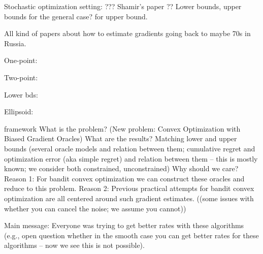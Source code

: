 Stochastic optimization setting: ??? Shamir's paper \cite{shamir2012complexity}??
Lower bounds, upper bounds for the general case?
\cite{hazan2014bandit} for upper bound.

All kind of papers about how to estimate gradients going back to maybe 70s in Russia.

One-point: \cite{flaxman2005online}

Two-point: \cite{AgDeXi10}

Lower bds: \cite{raginsky2011information} \cite{Chen88:LB-AoS}

Ellipsoid: \cite{AgFoHsuKaRa13:SIAM}



 framework
What is the problem? (New problem: Convex Optimization with Biased Gradient Oracles)
What are the results? Matching lower and upper bounds (several oracle models and relation between them; cumulative regret and optimization error (aka simple regret) and relation between them -- this is mostly known; we consider both constrained, unconstrained)
Why should we care?
Reason 1: For bandit convex optimization we can construct these oracles and reduce to this problem.
Reason 2: Previous practical attempts for bandit convex optimization are all centered around such gradient estimates.
((some issues with whether you can cancel the noise; we assume you cannot))

Main message: Everyone was trying to get better rates with these algorithms (e.g., open question whether in the smooth case you can get better rates for these algorithms -- now we see this is not possible).
\fi
